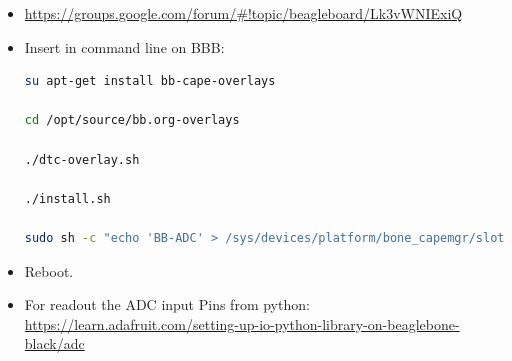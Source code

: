 \documentclass[
	fontsize=10pt
	paper=a4
]{scrartcl}
\begin{document}
\begin{itemize}

\item \url{https://groups.google.com/forum/#!topic/beagleboard/Lk3vWNIExiQ}

\item Insert in command line on BBB:

\begin{lstlisting}[language=bash]
su apt-get install bb-cape-overlays

cd /opt/source/bb.org-overlays

./dtc-overlay.sh

./install.sh

sudo sh -c "echo 'BB-ADC' > /sys/devices/platform/bone_capemgr/slots"
\end{lstlisting}


\item Reboot.

\item For readout the ADC input Pins from python: \url{https://learn.adafruit.com/setting-up-io-python-library-on-beaglebone-black/adc}


\end{itemize}
\end{document}
